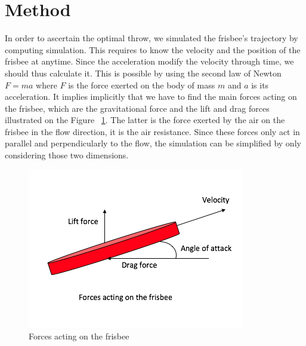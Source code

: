 \documentclass[10pt,a4paper]{report}
\begin{document}
\section{Method}
In order to ascertain the optimal throw, we simulated the frisbee's trajectory by computing simulation. This requires to know the velocity and the position of the frisbee at anytime. Since the acceleration modify the velocity through time, we should thus calculate it. This is possible by using the second law of Newton $F = ma$ where $F$ is the force exerted on the body of mass $m$ and $a$ is its acceleration. It implies implicitly that we have to find the main forces acting on the frisbee,  which are the gravitational force and the lift and drag forces illustrated on the Figure ~\ref{Forces acting on the frisbee}. The latter is the force exerted by the air on the frisbee in the flow direction, it is the air resistance. Since these forces only act in parallel and perpendicularly to the flow, the simulation can be simplified by only considering those two dimensions.

\begin{figure}[H]
\centering
\includegraphics[scale=0.6]{forces.jpg}
\caption{Forces acting on the frisbee}
\label{Forces acting on the frisbee}
\end{figure}
\end{document}
